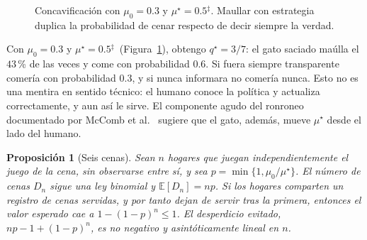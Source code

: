 \documentclass[11pt,a4paper]{article}
\theoremstyle{plain}
\newtheorem{proposicion}[teorema]{Proposición}
\theoremstyle{definition}
\theoremstyle{remark}
\numberwithin{equation}{section}
\newcommand{\E}{\mathbb{E}}
\newcommand{\calib}{{\ensuremath{^{\ddagger}}}}
\begin{document}
\begin{figure}[ht]
\centering
{}
\caption{Concavificación con $\mu_0=0.3$ y $\mu^\star=0.5$\calib. Maullar con estrategia duplica la probabilidad de cenar respecto de decir siempre la verdad.}\label{fig:concavo}
\end{figure}

Con $\mu_0=0.3$ y $\mu^\star=0.5$\calib\ (Figura~\ref{fig:concavo}), obtengo $q^\star=3/7$: el gato saciado maúlla el $43$\,\% de las veces y come con probabilidad $0.6$. Si fuera siempre transparente comería con probabilidad $0.3$, y si nunca informara no comería nunca. Esto no es una mentira en sentido técnico: el humano conoce la política y actualiza correctamente, y aun así le sirve. El componente agudo del ronroneo documentado por McComb et al.~\cite{mccomb} sugiere que el gato, además, mueve $\mu^\star$ desde el lado del humano.

\begin{proposicion}[Seis cenas]\label{prop:seis}
Sean $n$ hogares que juegan independientemente el juego de la cena, sin observarse entre sí, y sea $p=\min\{1,\mu_0/\mu^\star\}$. El número de cenas $D_n$ sigue una ley binomial y $\E[D_n]=np$. Si los hogares comparten un registro de cenas servidas, y por tanto dejan de servir tras la primera, entonces el valor esperado cae a $1-(1-p)^n\le 1$. El desperdicio evitado, $np-1+(1-p)^n$, es no negativo y asintóticamente lineal en $n$.
\end{proposicion}
\end{document}
